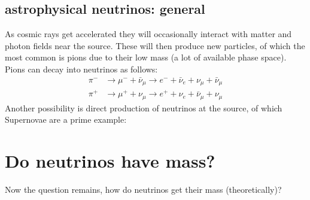 \documentclass[11pt,a4paper,faculty=we,language=en,doctype=report]{cls/ugent-doc}
\begin{document}
\subsection{astrophysical neutrinos: general}
As cosmic rays get accelerated they will occasionally interact with matter
and photon fields near the source. These will then produce new particles,
of which the most common is pions due to their low mass (a lot of available 
phase space). Pions can decay
into neutrinos as follows:
\begin{eqnarray}
	\pi^- &\rightarrow \mu^- + \bar{\nu}_\mu \rightarrow e^- + \bar{\nu}_e + \nu_\mu + \bar{\nu}_\mu\\
	\pi^+ &\rightarrow \mu^+ + \nu_\mu \rightarrow e^+ + \nu_e + \bar{\nu}_\mu + \nu_\mu
\end{eqnarray}
Another possibility is direct production of neutrinos at the source, of which Supernovae are
a prime example:

\section{Do neutrinos have mass?}
Now the question remains, how do neutrinos get their mass (theoretically)?
\end{document}
